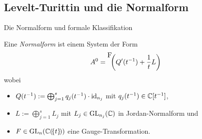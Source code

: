 \subsection{Levelt-Turittin und die Normalform}
\begin{frame}{Die Normalform und formale Klassifikation}
  \begin{defn}
    Eine \emph{Normalform} ist einem System der Form
    \[
      A^0= \raisebox{1em}{F} \!\!\left(Q'(t^{-1})+\frac{1}{t}L\right)
    \]
    wobei
    \begin{itemize}
    \item $Q(t^{-1}):=\bigoplus_{j=1}^sq_j(t^{-1})\cdot\operatorname{id}_{n_j}$ mit
      $q_j(t^{-1})\in\mathbb{C}[t^{-1}]$,
    \item $L:=\bigoplus_{j=1}^sL_j$ mit $L_j\in\operatorname{GL}_{n_j}(\mathbb{C})$ in
      Jordan-Normalform und
    \item $F\in\operatorname{GL}_n(\mathbb{C}(\!\{t\}\!))$ eine Gauge-Transformation.
    \end{itemize}
  \end{defn}
\end{frame}

